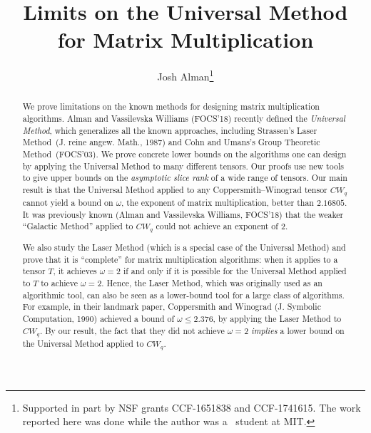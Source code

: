 \documentclass{toc}
\begin{document}
\begin{frontmatter} %
  
%
\title{Limits on the Universal Method\\ for Matrix Multiplication}  %

%
%

%
%
%

%
%
%
%
%
%
%
%
%
%
%
%


%
%
%
%

%

\author[alman]{Josh Alman\thanks{Supported in part by NSF
grants %
CCF-1651838 and
%
%
CCF-1741615.  The work reported here was done while the author was
a \phd\ student at MIT.}}    %

%
%
%
%

%

%
%
%
%
%
\begin{abstract}
%
  We prove limitations on the known methods for designing matrix multiplication algorithms. Alman and Vassilevska Williams (FOCS'18) recently defined
 the \emph{Universal Method}, which
%
generalizes all the known approaches, %
 including Strassen's Laser Method~(J. reine angew. Math.,
%
 1987) and Cohn and %
Umans's   %
Group Theoretic Method~(FOCS'03). We prove concrete lower bounds on the algorithms one can design by applying the Universal Method to many different tensors. Our proofs use new tools
%
to give upper bounds on  %
the \emph{asymptotic slice rank} of a wide range of tensors. Our main result is that the Universal Method applied to any Coppersmith--Winograd tensor $CW_q$ cannot yield a bound on $\omega$, the exponent of matrix multiplication, better than $2.16805$. %
%
It was previously
%
known %
%
(Alman and Vassilevska Williams, FOCS'18)
that the weaker ``Galactic Method'' applied to $CW_q$ could not achieve an
exponent of $2$.

We also study the Laser Method (which is %
%
%
a special case of the Universal Method) and prove that it is
``complete'' for matrix multiplication algorithms: when it applies to a tensor $T$, it achieves $\omega = 2$ if and only if it is possible for the Universal Method applied to $T$ to achieve $\omega = 2$. Hence, the Laser Method, which was originally used as an algorithmic tool, can also be seen as a
%
lower-bound tool for a large class of algorithms.  %
For example, in their landmark paper, Coppersmith and Winograd
%
(J. Symbolic Computation, 1990)  %
achieved a bound of $\omega \leq 2.376$, by applying the Laser Method to $CW_q$. By our result, the fact that they did not achieve $\omega=2$ \emph{implies} a lower bound on the Universal Method applied to $CW_q$. 
%
%
%
\end{abstract}

%

\end{frontmatter}
\newcommand{\RP}{\mathsf{RP}}
\end{document}
